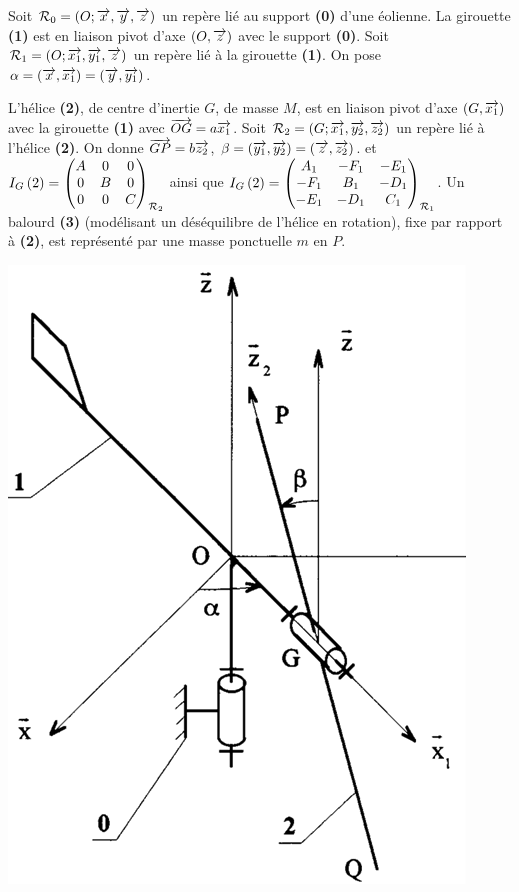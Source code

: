 \documentclass[10pt,fleqn]{article} %
\begin{document}
\def\pathfig{images}

\vspace{5cm}
\pagestyle{fancy}
\thispagestyle{plain}

\def\columnseprulecolor{\color{ocre}}
\setlength{\columnseprule}{0.4pt} 

\def\pathfig{images}

\ifprof
\else
\begin{multicols}{2}
\fi

Soit $\mathcal{R}_0=\repere{O}{x}{y}{z}$ un repère lié au support \textbf{(0)} d’une éolienne.
La girouette \textbf{(1)} est en liaison pivot d’axe $\axe{O}{z}$ avec le support \textbf{(0)}. Soit $\mathcal{R}_1=\repere{O}{x_1}{y_1}{z}$ un repère lié à la girouette \textbf{(1)}. On pose $\alpha=\angl{x}{x_1}=\angl{y}{y_1}$.

L’hélice \textbf{(2)}, de centre d’inertie $G$, de masse $M$, est en liaison pivot d’axe $\axe{G}{x_1}$ avec la girouette \textbf{(1)} avec $\vect{OG} = a \vect{x_1}$. Soit $\mathcal{R}_2=\repere{G}{x_1}{y_2}{z_2}$ un repère lié à l’hélice \textbf{(2)}. 
On donne  $\vect{GP}=b\vect{z_2}$, $\beta=\angl{y_1}{y_2}=\angl{z}{z_2}$.
et $\inertie{G}{2}=\matinertie{A}{B}{C}{0}{0}{0}{\mathcal{R}_2}$ ainsi que 
$\inertie{G}{2}=\matinertie{A_1}{B_1}{C_1}{-D_1}{-E_1}{-F_1}{\mathcal{R}_1}$.
Un balourd \textbf{(3)} (modélisant un déséquilibre de l’hélice en rotation), fixe par rapport à \textbf{(2)}, est représenté par une masse ponctuelle $m$ en $P$.


\begin{center}
\includegraphics[width=\linewidth]{images/fig_01}
\end{center}



\end{multicols}
\end{document}

